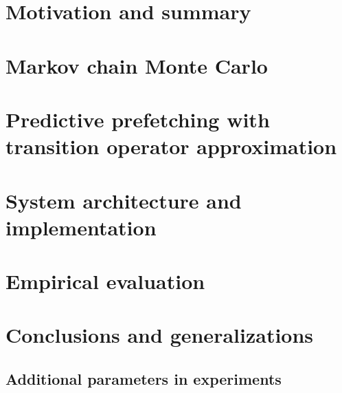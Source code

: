 \documentclass[12pt,oneside]{book}
\begin{document}
\frontmatter



\newpage

\tableofcontents



\mainmatter

\chapter{Motivation and summary}
\label{sec:introduction}


\chapter{Markov chain Monte Carlo}
\label{sec:mcmc}


\chapter{Predictive prefetching with transition operator approximation}
\label{sec:prefetching}


\chapter{System architecture and implementation}
\label{sec:system}


\chapter{Empirical evaluation}
\label{sec:evaluation}


\chapter{Conclusions and generalizations}
\label{sec:conclusions}





\newpage

\begin{appendices}
\chapter{Additional parameters in experiments}
\label{sec:appendix}

\end{appendices}
\end{document}

